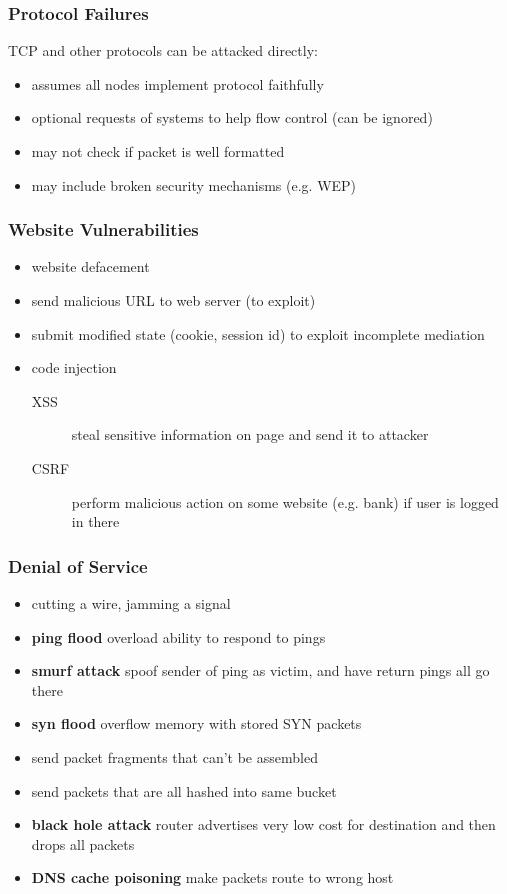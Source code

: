 \documentclass[]{article}
\theoremstyle{definition}
\begin{document}
	\subsubsection{Protocol Failures}
	TCP and other protocols can be attacked directly:
	\begin{itemize}
		\item assumes all nodes implement protocol faithfully
		\item optional requests of systems to help flow control (can be ignored)
		\item may not check if packet is well formatted
		\item may include broken security mechanisms (e.g. WEP)
	\end{itemize}

	\subsubsection{Website Vulnerabilities}
	\begin{itemize}
		\item website defacement
		\item send malicious URL to web server (to exploit)
		\item submit modified state (cookie, session id) to exploit incomplete mediation
		\item code injection
			\begin{description}
				\item[XSS] steal sensitive information on page and send it to attacker
				\item[CSRF] perform malicious action on some website (e.g. bank) if user is logged in there
			\end{description}
	\end{itemize}

	\subsubsection{Denial of Service}
	\begin{itemize}
		\item cutting a wire, jamming a signal
		\item \textbf{ping flood} overload ability to respond to pings
		\item \textbf{smurf attack} spoof sender of ping as victim, and have return pings all go there
		\item \textbf{syn flood} overflow memory with stored SYN packets
		\item send packet fragments that can't be assembled
		\item send packets that are all hashed into same bucket
		\item \textbf{black hole attack} router advertises very low cost for destination and then drops all packets
		\item \textbf{DNS cache poisoning} make packets route to wrong host
	\end{itemize}
\end{document}

